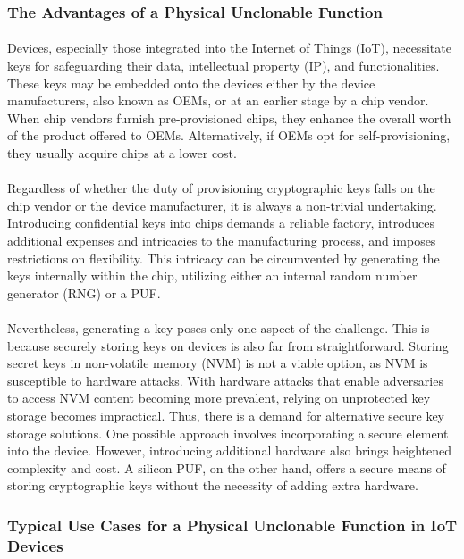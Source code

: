 \subsubsection{The Advantages of a Physical Unclonable Function}
\paragraph*{}
Devices, especially those integrated into the Internet of Things (IoT), necessitate keys for safeguarding their data, intellectual property (IP), and functionalities. These keys may be embedded onto the devices either by the device manufacturers, also known as OEMs, or at an earlier stage by a chip vendor. When chip vendors furnish pre-provisioned chips, they enhance the overall worth of the product offered to OEMs. Alternatively, if OEMs opt for self-provisioning, they usually acquire chips at a lower cost.
\paragraph*{}
Regardless of whether the duty of provisioning cryptographic keys falls on the chip vendor or the device manufacturer, it is always a non-trivial undertaking. Introducing confidential keys into chips demands a reliable factory, introduces additional expenses and intricacies to the manufacturing process, and imposes restrictions on flexibility. This intricacy can be circumvented by generating the keys internally within the chip, utilizing either an internal random number generator (RNG) or a PUF.
\paragraph*{}
Nevertheless, generating a key poses only one aspect of the challenge. This is because securely storing keys on devices is also far from straightforward. Storing secret keys in non-volatile memory (NVM) is not a viable option, as NVM is susceptible to hardware attacks. With hardware attacks that enable adversaries to access NVM content becoming more prevalent, relying on unprotected key storage becomes impractical. Thus, there is a demand for alternative secure key storage solutions. One possible approach involves incorporating a secure element into the device. However, introducing additional hardware also brings heightened complexity and cost. A silicon PUF, on the other hand, offers a secure means of storing cryptographic keys without the necessity of adding extra hardware.
\subsubsection{Typical Use Cases for a Physical Unclonable Function in IoT Devices}
